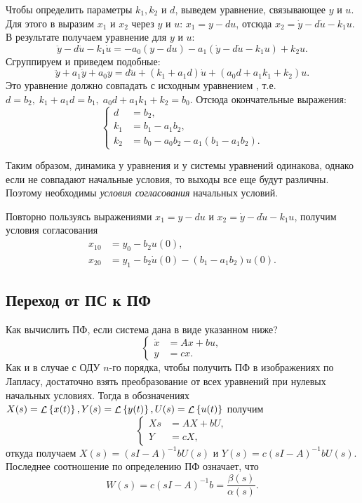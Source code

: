 \documentclass[../../TAU.tex]{subfiles}
\begin{document}
    Чтобы определить параметры $k_1,k_2$ и $d$, выведем уравнение, связывающее $y$ и $u$. Для этого в  выразим $x_1$ и $x_2$ через $y$ и $u$:
    $x_1 = y - du$, 
    отсюда 
    $x_2 = \dot y - d\dot u -k_1 u$. 
    В результате получаем уравнение для $y$ и $u$:
    $$
        \ddot y - d \ddot u -k_1\dot u = -a_0 (y-du)-a_1(\dot y - d \dot u - k_1 u)+k_2u.
    $$
    Сгруппируем и приведем подобные:
    $$
        \ddot y +a_1\dot y + a_0 y = d\ddot u + (k_1+a_1d)\dot u + (a_0 d + a_1k_1+k_2)u.
    $$
    Это уравнение должно совпадать с исходным уравнением , т.е.
    $d = b_2,\; k_1 + a_1d = b_1,\; a_0 d+a_1k_1+k_2 = b_0$. 
    Отсюда окончательные выражения:
    $$
        \left\{
        \begin{aligned}
            d&=b_2,\\
            k_1 &= b_1 - a_1b_2,\\
            k_2 &= b_0 - a_0 b_2 - a_1 (b_1-a_1b_2).
        \end{aligned}
        \right.
    $$

    Таким образом, динамика у уравнения  и у системы уравнений  одинакова, однако если не совпадают начальные условия, то выходы все еще будут различны. Поэтому необходимы {\it условия согласования} начальных условий.

    Повторно пользуясь выражениями 
    $x_1 = y - du$ 
    и 
    $x_2 = \dot y - d\dot u -k_1 u$, 
    получим условия согласования
    $$
        \begin{aligned}
            x_{10} &= y_0- b_2 u(0),\\
            x_{20} &= y_1-b_2\dot u (0) - (b_1-a_1b_2)u(0).
        \end{aligned}
    $$

\subsection{Переход от ПС к ПФ}

    Как вычислить ПФ, если система дана в виде указанном ниже?
    $$
        \left\{
        \begin{aligned}
            \dot x &= Ax+bu,\\
            y&= cx.
        \end{aligned}
        \right.
    $$
    Как и в случае с ОДУ $n$-го порядка, чтобы получить ПФ в изображениях по Лапласу, достаточно взять преобразование от всех уравнений при нулевых начальных условиях. Тогда в обозначениях 
    $X(s)=\mathop{\mathcal{L}}\nolimits\left\{x(t)\right\}, Y(s)=\mathop{\mathcal{L}}\nolimits\left\{y(t)\right\}, U(s) = \mathop{\mathcal{L}}\nolimits\left\{u(t)\right\}$ 
    получим
    $$
        \left\{
        \begin{aligned}
            Xs &= AX+bU,\\
            Y &= cX,
        \end{aligned}
        \right.
    $$
    откуда получаем 
    $X(s) = (sI-A)^{-1}b U(s)$ 
    и 
    $Y(s) = c(sI-A)^{-1}b U(s)$. 
    Последнее соотношение по определению ПФ означает, что
    $$
        W(s) = c (sI-A)^{-1}b = \frac{\beta(s)}{\alpha(s)}.
    $$
\end{document}
